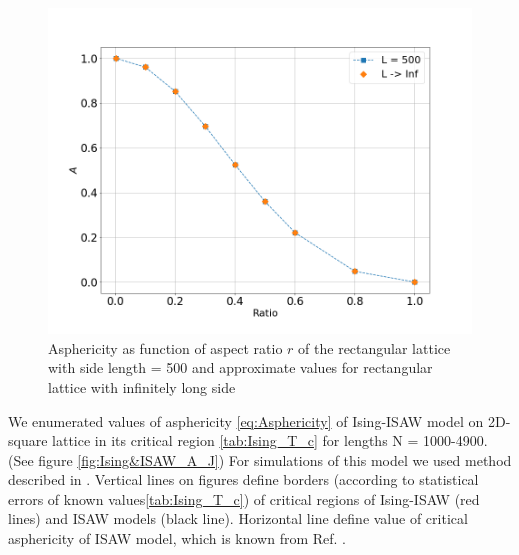 \documentclass[aps,pre,amssymb,amsmath,twocolumn,floatfix]{revtex4-2}
\begin{document}

\begin{figure}[h]
    \centering
    \includegraphics[width=\columnwidth]{Images/A_r.png}
    \caption{Asphericity as function of aspect ratio $r$ of the rectangular lattice with side length = 500 and approximate values for rectangular lattice with infinitely long side}
    \label{fig:A_r}
\end{figure}


We enumerated values of asphericity \eqref{eq:Asphericity} of Ising-ISAW model on 2D-square lattice in its critical region \ref{tab:Ising_T_c} for lengths N = 1000-4900. (See figure \ref{fig:Ising&ISAW_A_J}) For simulations of this model we used method described in \cite{faizullina2021critical}. Vertical lines on figures define borders (according to statistical errors of known values\ref{tab:Ising_T_c}) of critical regions of Ising-ISAW (red lines) and ISAW models (black line). Horizontal line define value of critical asphericity of ISAW model, which is known from Ref. \cite{Caracciolo_2011}. 
\end{document}
